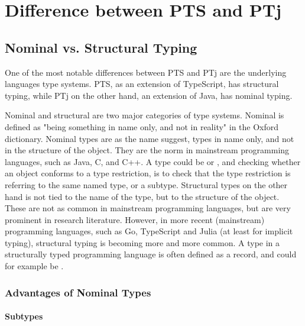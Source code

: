 
\chapter{Difference between PTS and PTj}\label{ch:difference-between-pts-and-ptj}


\section{Nominal vs. Structural Typing}\label{sec:nominal-vs-structural-typing}


One of the most notable differences between PTS and PTj are the underlying languages type systems.
PTS, as an extension of TypeScript, has structural typing, while PTj on the other hand, an extension of Java, has nominal typing.

Nominal and structural are two major categories of type systems.
Nominal is defined as "being something in name only, and not in reality" in the Oxford dictionary.
Nominal types are as the name suggest, types in name only, and not in the structure of the object.
They are the norm in mainstream programming languages, such as Java, C, and C++.
A type could be  or , and checking whether an object conforms to a type restriction, is to check that the type restriction is referring to the same named type, or a subtype.
Structural types on the other hand is not tied to the name of the type, but to the structure of the object.
These are not as common in mainstream programming languages, but are very prominent in research literature.
However, in more recent (mainstream) programming languages, such as Go, TypeScript and Julia (at least for implicit typing), structural typing is becoming more and more common.
A type in a structurally typed programming language is often defined as a record, and could for example be .

\subsection{Advantages of Nominal Types}\label{subsec:advantages-of-nominal-types}

\subsubsection{Subtypes}\label{subsubsec:subtypes}

